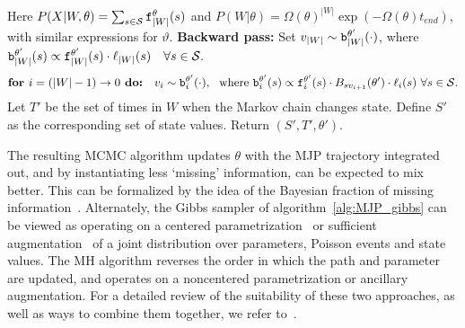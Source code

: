 \begin{algorithm}[H]
\begin{algorithmic}[1]
\begin{align}
          \end{align}
          Here $P(X|W,\theta) = \sum_{s \in {\mathcal S}} \mathtt{f}_{|W|}^\theta(s) $ and $P(W|\theta) = \Omega(\theta)^{|W|}\exp(-\Omega(\theta)t_{end})$, with similar expressions for $\vartheta$. 
    \State %
    \textbf{Backward pass:}
    Set $v_{|W|} \sim \mathtt{b}^{\theta'}_{|W|}(\cdot)$, where $\mathtt{b}^{\theta'}_{|W|}(s) \propto \mathtt{f}^{\theta'}_{|W|}(s)\cdot\ell_{|W|}(s) \quad \forall s \in {\mathcal S}.$ 
    $$ \textbf{for } i=(|W|-1)\rightarrow 0\textbf{ do:} \quad v_i \sim \mathtt{b}^{\theta'}_i(\cdot),\ \ \text{where } 
    \mathtt{b}^{\theta'}_i(s) \propto \mathtt{f}^{\theta'}_i(s)\cdot B_{sv_{i+1}}(\theta') \cdot \ell_i(s)  \ \forall s \in {\mathcal S}.$$
    \State Let $T'$ be the set of times in $W$ when the Markov chain changes state. Define $S'$ as the corresponding set of state values. Return $(S', T', \theta')$.
\end{algorithmic}
\end{algorithm}
The resulting MCMC algorithm updates $\theta$ with the MJP trajectory 
integrated out, and by instantiating less `missing' information, can be expected to mix better. 
This can be formalized by the idea of the Bayesian fraction of missing information~\citep{liu1994fraction, papaspiliopoulos2007general}. 
Alternately, the Gibbs sampler of algorithm~\ref{alg:MJP_gibbs} can be viewed as operating on a centered parametrization~\citep{papaspiliopoulos2007general} or sufficient augmentation~\citep{yu2011center} of a joint distribution over parameters, Poisson events and state values. The MH algorithm reverses the order in which the path and parameter are updated, and operates on a noncentered parametrization or ancillary augmentation.
For a detailed review of the suitability of these two approaches, as well as ways to combine them together, we refer to~\citet{papaspiliopoulos2007general, yu2011center}.

